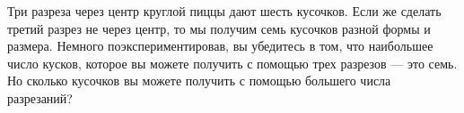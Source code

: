 ﻿

Три разреза через центр круглой пиццы дают шесть кусочков. Если же сделать третий разрез не через центр, то мы получим семь кусочков разной формы и размера. Немного поэкспериментировав, вы убедитесь в том, что наибольшее число кусков, которое вы можете получить с помощью трех разрезов --- это семь. Но сколько кусочков вы можете получить с помощью большего числа разрезаний?

\begin{center}  \end{center}

